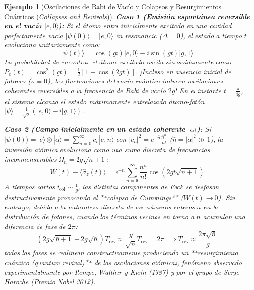 \documentclass[11pt,a4paper]{book}
\newtheorem{ejemplo}{Ejemplo}[chapter]
\begin{document}
\begin{ejemplo}[Oscilaciones de Rabi de Vacío y Colapsos y Resurgimientos Cuánticos (\textit{Collapses and Revivals})]
\textbf{Caso 1 (Emisión espontánea reversible en el vacío $|e, 0\rangle$):} Si el átomo entra inicialmente excitado en una cavidad perfectamente vacía $|\psi(0)\rangle = |e, 0\rangle$ en resonancia ($\Delta = 0$), el estado a tiempo $t$ evoluciona unitariamente como:
\begin{equation}
|\psi(t)\rangle = \cos(gt)|e, 0\rangle - i\sin(gt)|g, 1\rangle
\end{equation}
La probabilidad de encontrar el átomo excitado oscila sinusoidalmente como $P_e(t) = \cos^2(gt) = \frac{1}{2}[1 + \cos(2gt)]$. ¡Incluso en ausencia inicial de fotones ($n=0$), las fluctuaciones del vacío cuántico inducen oscilaciones coherentes reversibles a la frecuencia de Rabi de vacío $2g$! En el instante $t = \frac{\pi}{4g}$, el sistema alcanza el estado máximamente entrelazado átomo-fotón $|\psi\rangle = \frac{1}{\sqrt{2}}(|e,0\rangle - i|g,1\rangle)$.

\textbf{Caso 2 (Campo inicialmente en un estado coherente $|\alpha\rangle$):} Si $|\psi(0)\rangle = |e\rangle \otimes |\alpha\rangle = \sum_{n=0}^\infty c_n |e, n\rangle$ con $|c_n|^2 = e^{-\bar{n}}\frac{\bar{n}^n}{n!}$ ($\bar{n} = |\alpha|^2 \gg 1$), la inversión atómica evoluciona como una suma discreta de frecuencias inconmensurables $\Omega_n = 2g\sqrt{n+1}$:
\begin{equation}
W(t) \equiv \langle \hat{\sigma}_z(t) \rangle = e^{-\bar{n}} \sum_{n=0}^{\infty} \frac{\bar{n}^n}{n!} \cos\left(2gt\sqrt{n+1}\right)
\end{equation}
A tiempos cortos $t_{\text{col}} \sim \frac{1}{g}$, las distintas componentes de Fock se desfasan destructivamente provocando el **colapso de Cummings** ($W(t) \to 0$). Sin embargo, debido a la naturaleza discreta de los números enteros $n$ en la distribución de fotones, cuando los términos vecinos en torno a $\bar{n}$ acumulan una diferencia de fase de $2\pi$:
\[
\left( 2g\sqrt{\bar{n}+1} - 2g\sqrt{\bar{n}} \right) T_{\text{rev}} \approx \frac{g}{\sqrt{\bar{n}}} T_{\text{rev}} = 2\pi \implies T_{\text{rev}} \approx \frac{2\pi\sqrt{\bar{n}}}{g}
\]
todas las fases se realinean constructivamente produciendo un **resurgimiento cuántico (\textit{quantum revival})** de las oscilaciones atómicas, fenómeno observado experimentalmente por Rempe, Walther y Klein (1987) y por el grupo de Serge Haroche (Premio Nobel 2012).
\end{ejemplo}
\end{document}
